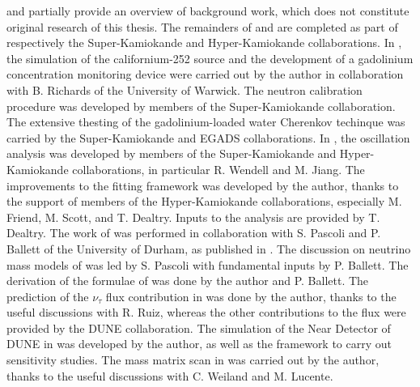  and partially  provide an overview of background work, %
which does not constitute original research of this thesis.
The remainders of  and  are completed %
as part of respectively the Super-Kamiokande and Hyper-Kamiokande collaborations.
In , the simulation of the californium-252 source and the development %
of a gadolinium concentration monitoring device were carried out by the author in collaboration with %
B. Richards of the University of Warwick.
The neutron calibration procedure was developed by members of the Super-Kamiokande collaboration. 
The extensive thesting of the gadolinium-loaded water Cherenkov techinque was carried by the Super-Kamiokande and EGADS collaborations.
In , the oscillation analysis was developed by members of the Super-Kamiokande and Hyper-Kamiokande collaborations, %
in particular R. Wendell and M. Jiang.
The improvements to the fitting framework was developed by the author, thanks to the support of members of the Hyper-Kamiokande collaborations, %
especially M. Friend, M. Scott, and T. Dealtry.
Inputs to the analysis are provided by T. Dealtry.
The work of  was performed in collaboration with %
S. Pascoli and P. Ballett of the University of Durham, as published in .
The discussion on neutrino mass models of  was led by S. Pascoli with %
fundamental inputs by P. Ballett.
The derivation of the formulae of  was done by the author and P. Ballett.
The prediction of the $\nu_\tau$ flux contribution in  was done by the author, %
thanks to the useful discussions with R. Ruiz, %
whereas the other contributions to the flux were provided by the DUNE collaboration.
The simulation of the Near Detector of DUNE in  was developed by the author, %
as well as the framework to carry out sensitivity studies.
The mass matrix scan in  was carried out by the author, thanks to the %
useful discussions with C. Weiland and M. Lucente.
